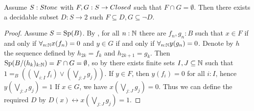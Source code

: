\begin{lemma}\label{StoneSeperated}
  Assume $S:\Stone $ with $F,G:S \to \Closed$ such that $F\cap G = \emptyset$. 
  Then there exists a decidable subset $D:S \to 2$ such $F\subseteq D, G \subseteq \neg D$. 
\end{lemma}
\begin{proof}
  Assume $S = \operatorname{Sp}(B)$. 
  By , for all $n:\mathbb{N}$ there are $f_n,g_n:B$ such that 
  $x\in F$ if and only if $\forall_{n:\mathbb{N}}x(f_n) = 0$ and 
  $y\in G$ if and only if $\forall_{n:\mathbb{N}}y(g_n) = 0$.
%
  Denote by $h$ the sequence defined by $h_{2k}=f_k$ and $h_{2k+1}=g_k$.
Then $\operatorname{Sp}(B/(h_k)_{k:\mathbb{N}}) = F \cap G=\emptyset$, so by 
%
  there exists finite sets $I,J\subseteq \mathbb{N} $ such that 
  $1 =_B ((\bigvee_{i:I}  f_i) \vee (\bigvee_{j:J}  g_j)).$
%
  If $y\in F$, then $y(f_i) = 0$ for all $i:I$, hence
  $y(\bigvee_{j:J} g_j) = 1 $
 If $x\in G$, we have 
  $x(\bigvee_{j:J} g_j) = 0$. 
  Thus we can define the required $D$ by 
  $D(x) \leftrightarrow x(\bigvee_{j:J} g_j) = 1$.
\end{proof} 

